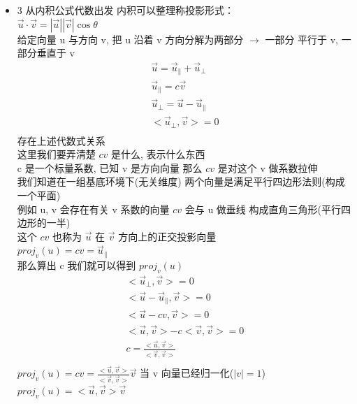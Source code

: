 \documentclass[12pt]{article}
\begin{document}
\begin{flushleft}
\begin{itemize}
              \vspace{0.5em}
        \item 3 从内积公式代数出发
              内积可以整理称投影形式： \\
              $\vec{u} \cdot \vec{v} = |\vec{u}||\vec{v}| \cos\theta$ \\
              给定向量 u 与方向 v, 把 u 沿着 v 方向分解为两部分 $\to$  一部分 平行于 v, 一部分垂直于 v \\
              \begin{align}
                  \vec{u} = \vec{u}_{\parallel} + \vec{u}_{\perp}  \\
                  \vec{u}_{\parallel} = c\vec{v}                   \\
                  \vec{u}_{\perp} =  \vec{u} - \vec{u}_{\parallel} \\
                  <\vec{u}_{\perp}, \vec{v}> = 0                   \\
              \end{align}
              存在上述代数式关系 \\
              这里我们要弄清楚 $cv$ 是什么, 表示什么东西 \\
              c 是一个标量系数, 已知 v 是方向向量 那么 $cv$ 是对这个 v 做系数拉伸 \\
              我们知道在一组基底环境下(无关维度) 两个向量是满足平行四边形法则(构成一个平面) \\
              例如 u, v  会存在有关 v 系数的向量 $cv$ 会与 u 做垂线 构成直角三角形(平行四边形的一半) \\
              这个 $cv$ 也称为 $\vec{u}$ 在 $\vec{v}$ 方向上的正交投影向量 \\
              $proj_{v}(u) = cv = \vec{u}_{\parallel}$ \\
              那么算出 c 我们就可以得到 $proj_{v}(u)$ \\
              \begin{align}
                  <\vec{u}_{\perp}, \vec{v}> = 0                   \\
                  <\vec{u} - \vec{u}_{\parallel}, \vec{v}> = 0     \\
                  <\vec{u} - cv, \vec{v}> = 0                      \\
                  <\vec{u},\vec{v}> - c<\vec{v}, \vec{v}> = 0      \\
                  c = \frac{<\vec{u},\vec{v}>}{<\vec{v}, \vec{v}>} \\
              \end{align}
              $proj_{v}(u) = cv = \frac{<\vec{u},\vec{v}>}{<\vec{v}, \vec{v}>}\vec{v}$
              当 v 向量已经归一化($|v| = 1$) \\
              $proj_{v}(u) = <\vec{u},\vec{v}>\vec{v}$ \\


\end{itemize}
\end{flushleft}
\end{document}
